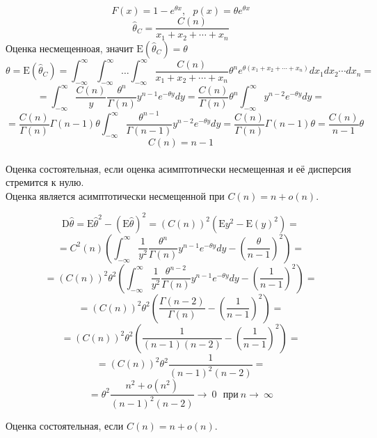 \documentclass[12pt]{extreport}
\theoremstyle{definiton}
\theoremstyle{definition}
\theoremstyle{definition}
\newcounter{problem}
\renewcommand{\theproblem}{\arabic{problem}}
\newcommand{\problemname}{\color{blue} Задача}
\newenvironment{problem}[1]{
	\addtocounter{problem}{1}\noindent{\large\bfseries \problemname{} \theproblem \,.
		}
}{
	\par\bigskip
}
\begin{document}
\begin{problem}{5}
$$F(x) = 1 - e^{\theta x}, \ \ \ p(x) = \theta e^{\theta x}$$
$$\hat{\theta}_C = \frac{C(n)}{x_1 + x_2 + \cdots + x_n}$$
Оценка несмещенноая, значит $\mathrm{E}\left(\hat{\theta}_C\right) = \theta$
$$\theta = \mathrm{E}\left(\hat{\theta}_C\right) = \int_{-\infty}^{\infty}\int_{-\infty}^{\infty}\ldots\int_{-\infty}^{\infty}\frac{C(n)}{x_1 + x_2 + \cdots + x_n}\theta^n e^{\theta \left(x_1 + x_2 + \cdots + x_n\right)}dx_1 dx_2 \cdots dx_n = $$
$$= \int_{-\infty}^{\infty} \frac{C(n)}{y} \frac{\theta^n}{\Gamma(n)}y^{n-1}e^{-\theta y} dy = \frac{C(n)}{\Gamma(n)} \theta^n \int_{-\infty}^{\infty} y^{n-2}e^{-\theta y} dy = $$
$$= \frac{C(n)}{\Gamma(n)}\Gamma(n-1) \theta \int_{-\infty}^{\infty} \frac{\theta^{n-1}}{\Gamma(n-1)} y^{n-2}e^{-\theta y} dy = \frac{C(n)}{\Gamma(n)}\Gamma(n-1) \theta = \frac{C(n)}{n-1} \theta$$
$$C(n) = n-1$$
\\
Оценка состоятельная, если оценка асимптотически несмещенная и её дисперсия стремится к нулю.
\\
Оценка является асимптотически несмещенной при $C(n) = n + o(n).$

$$\mathrm{D}\hat{\theta} = \mathrm{E}\hat{\theta}^2 - \left(\mathrm{E}\hat{\theta}\right)^2 = \left(C\left(n\right)\right)^2 \left(\mathrm{E}y^2 - \mathrm{E}\left(y\right)^2\right) =$$
$$ = C^2(n) \left( 
\int_{-\infty}^{\infty} \frac{1}{y^2} \frac{\theta^n}{\Gamma(n)}y^{n-1}e^{-\theta y} dy - \left(\frac{\theta}{n-1}\right)^2
\right) =$$
$$ = \left(C\left(n\right)\right)^2 \theta^2 \left( 
\int_{-\infty}^{\infty} \frac{1}{y^2} \frac{\theta^{n-2}}{\Gamma(n)}y^{n-1}e^{-\theta y} dy - \left(\frac{1}{n-1}\right)^2
\right) =
$$
$$ = \left(C\left(n\right)\right)^2 \theta^2 \left( 
\frac{\Gamma(n-2)}{\Gamma(n)} - \left(\frac{1}{n-1}\right)^2
\right) = $$
$$ = \left(C\left(n\right)\right)^2 \theta^2 \left( 
\frac{1}{(n-1)(n-2)} - \left(\frac{1}{n-1}\right)^2
\right) =$$
$$= \left(C\left(n\right)\right)^2 \theta^2 \frac{1}{(n-1)^2(n-2)} = $$
$$= \theta^2 \frac{n^2 + o(n^2)}{(n-1)^2(n-2)} \rightarrow \ 0 \ \ \ \text{при} \ n \rightarrow \ \infty 
$$

Оценка состоятельная, если  $C(n) = n + o(n).$
\end{problem}
\end{document}
